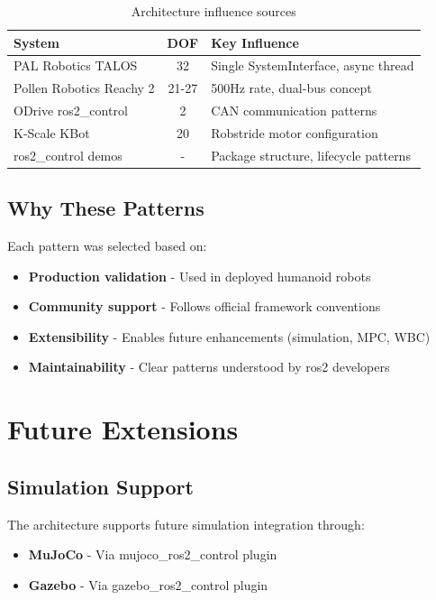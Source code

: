 \documentclass[12pt,a4paper]{article}
\begin{document}
\begin{table}[h]
    \centering
    \begin{tabular}{|l|c|p{5cm}|}
        \hline
        \textbf{System} & \textbf{DOF} & \textbf{Key Influence} \\
        \hline
        PAL Robotics TALOS & 32 & Single SystemInterface, async thread \\
        \hline
        Pollen Robotics Reachy 2 & 21-27 & 500Hz rate, dual-bus concept \\
        \hline
        ODrive ros2\_control & 2 & CAN communication patterns \\
        \hline
        K-Scale KBot & 20 & Robstride motor configuration \\
        \hline
        ros2\_control demos & - & Package structure, lifecycle patterns \\
        \hline
    \end{tabular}
    \caption{Architecture influence sources}
\end{table}

\subsection{Why These Patterns}
Each pattern was selected based on:

\begin{itemize}
    \item \textbf{Production validation} - Used in deployed humanoid robots
    \item \textbf{Community support} - Follows official framework conventions
    \item \textbf{Extensibility} - Enables future enhancements (simulation, MPC, WBC)
    \item \textbf{Maintainability} - Clear patterns understood by ros2 developers
\end{itemize}

\section{Future Extensions}

\subsection{Simulation Support}
The architecture supports future simulation integration through:

\begin{itemize}
    \item \textbf{MuJoCo} - Via mujoco\_ros2\_control plugin
    \item \textbf{Gazebo} - Via gazebo\_ros2\_control plugin
\end{itemize}
\end{document}
